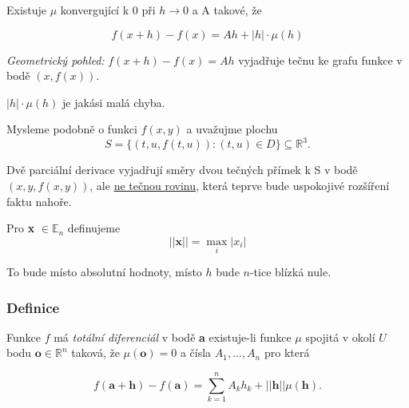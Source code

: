 \documentclass[../main.tex]{subfiles}
\begin{document}
\noindent
\hspace{1.2mm}
Existuje $\mu$ konvergující k 0 při $h \rightarrow 0$ a A takové, že 

\[f(x+h) - f(x) = Ah + |h| \cdot \mu(h)\]

\noindent
\hspace{1.2mm}
\textit{Geometrický pohled:}
$f(x+h) - f(x) = Ah$ vyjadřuje tečnu ke grafu funkce v bodě $(x,f(x)).$

\noindent
\hspace{1.2mm}
$|h|\cdot \mu(h)$ je jakási malá chyba.

\noindent
\hspace{1.2mm}
Mysleme podobně o funkci $f(x,y)$ a uvažujme plochu 
\[S = \{(t,u,f(t,u)) : (t,u) \in D\} \subseteq \mathbb{R}^3.\]

\noindent
\hspace{1.2mm}
Dvě parciální derivace vyjadřují směry dvou tečných přímek k S v bodě $(x,y,f(x,y))$, ale \underline{ne tečnou rovinu}, 
která teprve bude uspokojivé rozšíření faktu nahoře.

\noindent
\hspace{1.2mm}
Pro \textbf{x} $\in \mathbb{E}_n$ definujeme
\[||\textbf{x}||  = \max_i|x_i|\]

\noindent
\hspace{1.2mm}
To bude místo absolutní hodnoty, místo $h$ bude $n$-tice blízká nule.

\subsubsection{Definice}
\hspace{1.2mm}
Funkce $f$ má \textit{totální diferenciál} v bodě \textbf{a} existuje-li funkce $\mu$ spojitá v okolí $U$ bodu $\textbf{o} \in \mathbb{R}^n$ taková, že $\mu(\textbf{o}) = 0$
a čísla $A_1,...,A_n$ pro která

\[f(\textbf{a}+\textbf{h}) - f(\textbf{a}) = \sum^n_{k=1}A_kh_k+||\textbf{h}||\mu(\textbf{h}).\]

\end{document}
